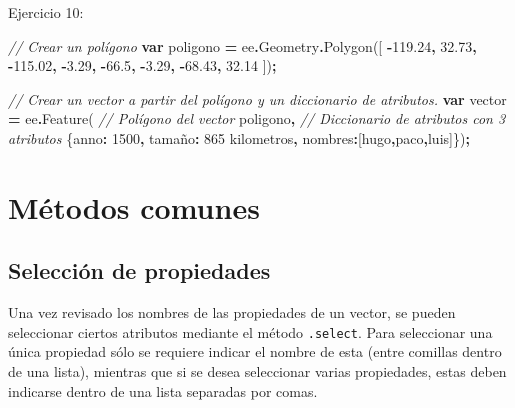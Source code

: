 \documentclass[
  12pt,
  letterpaper,
  twoside]{book}
\newenvironment{Shaded}{\begin{snugshade}}{\end{snugshade}}
\newcommand{\AttributeTok}[1]{\textcolor[rgb]{0.77,0.63,0.00}{#1}}
\newcommand{\CommentTok}[1]{\textcolor[rgb]{0.56,0.35,0.01}{\textit{#1}}}
\newcommand{\DataTypeTok}[1]{\textcolor[rgb]{0.13,0.29,0.53}{#1}}
\newcommand{\DecValTok}[1]{\textcolor[rgb]{0.00,0.00,0.81}{#1}}
\newcommand{\FloatTok}[1]{\textcolor[rgb]{0.00,0.00,0.81}{#1}}
\newcommand{\FunctionTok}[1]{\textcolor[rgb]{0.00,0.00,0.00}{#1}}
\newcommand{\KeywordTok}[1]{\textcolor[rgb]{0.13,0.29,0.53}{\textbf{#1}}}
\newcommand{\NormalTok}[1]{#1}
\newcommand{\OperatorTok}[1]{\textcolor[rgb]{0.81,0.36,0.00}{\textbf{#1}}}
\newcommand{\StringTok}[1]{\textcolor[rgb]{0.31,0.60,0.02}{#1}}
\begin{document}
Ejercicio 10:

\begin{Shaded}
\begin{Highlighting}[]
\CommentTok{// Crear un polígono}
\KeywordTok{var}\NormalTok{ poligono }\OperatorTok{=}\NormalTok{ ee}\OperatorTok{.}\AttributeTok{Geometry}\OperatorTok{.}\FunctionTok{Polygon}\NormalTok{([}
  \OperatorTok{{-}}\FloatTok{119.24}\OperatorTok{,} \FloatTok{32.73}\OperatorTok{,}
  \OperatorTok{{-}}\FloatTok{115.02}\OperatorTok{,} \OperatorTok{{-}}\FloatTok{3.29}\OperatorTok{,}
  \OperatorTok{{-}}\FloatTok{66.5}\OperatorTok{,} \OperatorTok{{-}}\FloatTok{3.29}\OperatorTok{,}
  \OperatorTok{{-}}\FloatTok{68.43}\OperatorTok{,} \FloatTok{32.14}
\NormalTok{])}\OperatorTok{;}

\CommentTok{// Crear un vector a partir del polígono y un diccionario de atributos.}
\KeywordTok{var}\NormalTok{ vector }\OperatorTok{=}\NormalTok{ ee}\OperatorTok{.}\FunctionTok{Feature}\NormalTok{(}
  \CommentTok{// Polígono del vector}
\NormalTok{  poligono}\OperatorTok{,}                      
  \CommentTok{// Diccionario de atributos con 3 atributos}
\NormalTok{  \{}\DataTypeTok{anno}\OperatorTok{:} \DecValTok{1500}\OperatorTok{,}                    
  \DataTypeTok{tamaño}\OperatorTok{:} \StringTok{\textquotesingle{}865 kilometros\textquotesingle{}}\OperatorTok{,}
  \DataTypeTok{nombres}\OperatorTok{:}\NormalTok{[}\StringTok{\textquotesingle{}hugo\textquotesingle{}}\OperatorTok{,}\StringTok{\textquotesingle{}paco\textquotesingle{}}\OperatorTok{,}\StringTok{\textquotesingle{}luis\textquotesingle{}}\NormalTok{]\})}\OperatorTok{;}
\end{Highlighting}
\end{Shaded}

\hypertarget{muxe9todos-comunes-1}{%
\section{Métodos comunes}\label{muxe9todos-comunes-1}}

\hypertarget{selecciuxf3n-de-propiedades}{%
\subsection{Selección de propiedades}\label{selecciuxf3n-de-propiedades}}

Una vez revisado los nombres de las propiedades de un vector, se pueden seleccionar ciertos atributos mediante el método \texttt{.select}. Para seleccionar una única propiedad sólo se requiere indicar el nombre de esta (entre comillas dentro de una lista), mientras que si se desea seleccionar varias propiedades, estas deben indicarse dentro de una lista separadas por comas.
\end{document}

